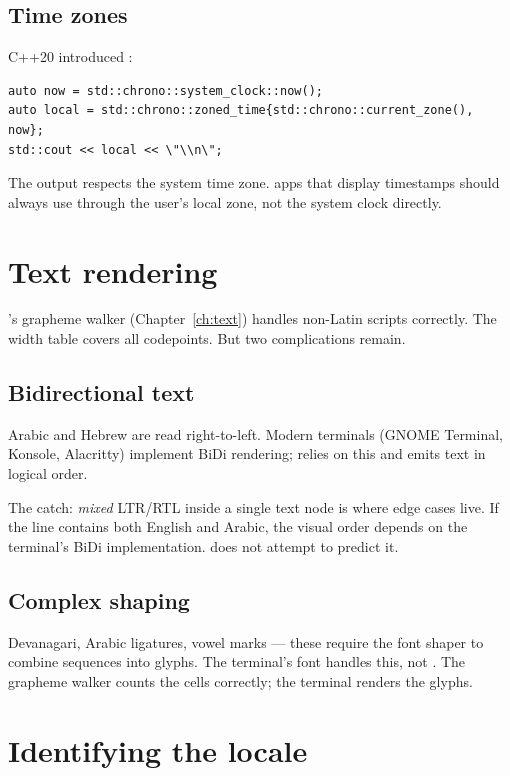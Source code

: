 \subsection*{Time zones}

C++20 introduced :

\begin{lstlisting}
auto now = std::chrono::system_clock::now();
auto local = std::chrono::zoned_time{std::chrono::current_zone(), now};
std::cout << local << \"\\n\";
\end{lstlisting}

The output respects the system time zone. \maya{} apps that
display timestamps should always use 
through the user's local zone, not the system clock directly.

\section{Text rendering}

\maya{}'s grapheme walker (Chapter~\ref{ch:text}) handles
non-Latin scripts correctly. The width table covers all
codepoints. But two complications remain.

\subsection*{Bidirectional text}

Arabic and Hebrew are read right-to-left. Modern terminals
(GNOME Terminal, Konsole, Alacritty) implement BiDi rendering;
\maya{} relies on this and emits text in logical order.

The catch: \emph{mixed} LTR/RTL inside a single text node is
where edge cases live. If the line contains both English and
Arabic, the visual order depends on the terminal's BiDi
implementation. \maya{} does not attempt to predict it.

\subsection*{Complex shaping}

Devanagari, Arabic ligatures, vowel marks --- these require
the font shaper to combine sequences into glyphs. The terminal's
font handles this, not \maya{}. The grapheme walker counts the
cells correctly; the terminal renders the glyphs.

\section{Identifying the locale}

